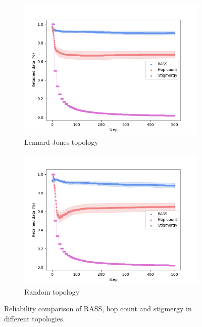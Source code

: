 \begin{figure}
\begin{subfigure}{0.48\textwidth}
        \includegraphics[width=\textwidth]{figures/dora_mesh/lennard_reliability.png}
        \caption{Lennard-Jones topology}
        \label{results:lennard_100_reliability}
    \end{subfigure}
    \begin{subfigure}{0.48\textwidth}
        \includegraphics[width=\textwidth]{figures/dora_mesh/random_reliability.png}
        \caption{Random topology}
        \label{results:random_100_reliability}
    \end{subfigure}
    \caption[RASS reliability]{Reliability comparison of \ac{RASS}, hop count and stigmergy in different topologies.}
    \label{results:rass_reliability}
\end{figure}

